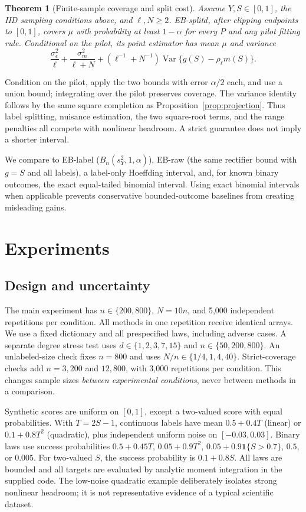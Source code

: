 \documentclass{article}
\newtheorem{theorem}{Theorem}
\newcommand{\Var}{\operatorname{Var}}
\newcommand{\ind}{\mathbf 1}
\begin{document}
\begin{theorem}[Finite-sample coverage and split cost]
\label{thm:finite}
Assume $Y,S\in[0,1]$, the IID sampling conditions above, and $\ell,N\ge2$. EB-split$d$, after clipping endpoints to $[0,1]$, covers $\mu$ with probability at least $1-\alpha$ for every $P$ and any pilot fitting rule. Conditional on the pilot, its point estimator has mean $\mu$ and variance
\begin{equation}
 \frac{\sigma_\epsilon^2}{\ell}+\frac{\sigma_m^2}{\ell+N}
 +(\ell^{-1}+N^{-1})\Var\{g(S)-\rho_\ell m(S)\}.
 \label{eq:splitcost}
\end{equation}
\end{theorem}
Condition on the pilot, apply the two bounds with error $\alpha/2$ each, and use a union bound; integrating over the pilot preserves coverage. The variance identity follows by the same square completion as Proposition~\ref{prop:projection}. Thus label splitting, nuisance estimation, the two square-root terms, and the range penalties all compete with nonlinear headroom. A strict guarantee does not imply a shorter interval.

We compare to EB-label ($B_n(s_Y^2,1,\alpha)$), EB-raw (the same rectifier bound with $g=S$ and all labels), a label-only Hoeffding interval, and, for known binary outcomes, the exact equal-tailed binomial interval. Using exact binomial intervals when applicable prevents conservative bounded-outcome baselines from creating misleading gains.

\section{Experiments}
\label{sec:experiments}
\subsection{Design and uncertainty}
The main experiment has $n\in\{200,800\}$, $N=10n$, and 5,000 independent repetitions per condition. All methods in one repetition receive identical arrays. We use a fixed dictionary and all prespecified laws, including adverse cases. A separate degree stress test uses $d\in\{1,2,3,7,15\}$ and $n\in\{50,200,800\}$. An unlabeled-size check fixes $n=800$ and uses $N/n\in\{1/4,1,4,40\}$. Strict-coverage checks add $n=3,200$ and $12,800$, with 3,000 repetitions per condition. This changes sample sizes \emph{between experimental conditions}, never between methods in a comparison.

Synthetic scores are uniform on $[0,1]$, except a two-valued score with equal probabilities. With $T=2S-1$, continuous labels have mean $0.5+0.4T$ (linear) or $0.1+0.8T^2$ (quadratic), plus independent uniform noise on $[-0.03,0.03]$. Binary laws use success probabilities $0.5+0.45T$, $0.05+0.9T^2$, $0.05+0.9\ind\{S>0.7\}$, $0.5$, or $0.005$. For two-valued $S$, the success probability is $0.1+0.8S$. All laws are bounded and all targets are evaluated by analytic moment integration in the supplied code. The low-noise quadratic example deliberately isolates strong nonlinear headroom; it is not representative evidence of a typical scientific dataset.
\end{document}
